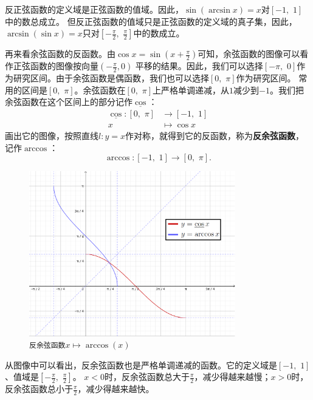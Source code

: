 \documentclass[12pt,UTF8]{ctexbook}
\begin{document}
反正弦函数的定义域是正弦函数的值域。因此，$\sin{(\arcsin{x})} = x$对$[-1,\,\, 1]$中的数总成立。
但反正弦函数的值域只是正弦函数的定义域的真子集，因此，$\arcsin{(\sin{x})} = x$只对$[-\frac{\pi}{2}, \,\, \frac{\pi}{2}]$中的数成立。

再来看余弦函数的反函数。由$\cos{x} = \sin(x+\frac{\pi}{2})$可知，余弦函数的图像可以看作正弦函数的图像按向量$\left(-\frac{\pi}{2}, 0\right)$
平移的结果。因此，我们可以选择$[-\pi, \,\, 0]$作为研究区间。由于余弦函数是偶函数，我们也可以选择$[0,\,\,\pi]$作为研究区间。
常用的区间是$[0,\,\,\pi]$。余弦函数在$[0,\,\,\pi]$上严格单调递减，从$1$减少到$-1$。我们把余弦函数在这个区间上的部分记作$\underline{\cos}$：
\begin{align*}
    \underline{\cos} : [0,\,\,\pi] &\rightarrow [-1,\,\, 1] \\                                  x &\mapsto \cos{x} 
\end{align*}
画出它的图像，按照直线$l: y = x$作对称，就得到它的反函数，称为\textbf{反余弦函数}，记作$\arccos$：
$$ \arccos : [-1,\,\, 1] \rightarrow [0,\,\,\pi] . $$

\begin{figure}[h] %
    \vspace{4pt}
    \centering
    \includegraphics[width=0.8\textwidth]{tu/反余弦函数1.png}
    \caption*{\texttt{反余弦函数}$x\mapsto \arccos(x)$}
\end{figure}

从图像中可以看出，反余弦函数也是严格单调递减的函数。它的定义域是$[-1,\,\, 1]$、值域是$[-\frac{\pi}{2}, \,\, \frac{\pi}{2}]$。
$x < 0$时，反余弦函数总大于$\frac{\pi}{2}$，减少得越来越慢；$x > 0$时，反余弦函数总小于$\frac{\pi}{2}$，减少得越来越快。
\end{document}
